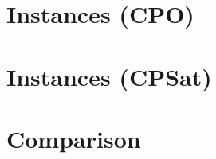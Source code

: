 \documentclass[a4paper]{article}
\begin{document}
\section{Instances (CPO)}


\section{Instances (CPSat)}


\section{Comparison}

\end{document}
